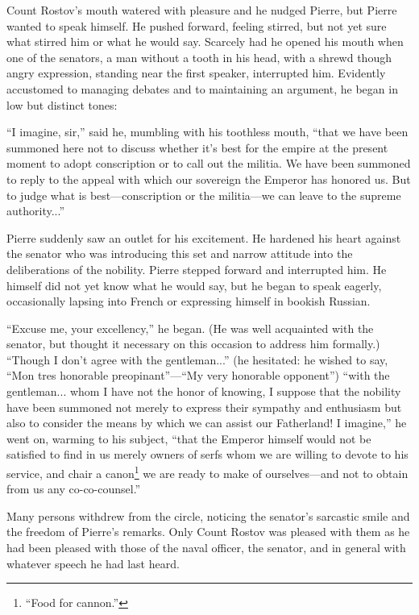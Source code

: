 Count Rostov's mouth watered with pleasure and he nudged Pierre,
but Pierre wanted to speak himself. He pushed forward, feeling
stirred, but not yet sure what stirred him or what he would
say. Scarcely had he opened his mouth when one of the senators, a
man without a tooth in his head, with a shrewd though angry
expression, standing near the first speaker, interrupted
him. Evidently accustomed to managing debates and to maintaining
an argument, he began in low but distinct tones:

``I imagine, sir,'' said he, mumbling with his toothless mouth,
``that we have been summoned here not to discuss whether it's
best for the empire at the present moment to adopt conscription
or to call out the militia.  We have been summoned to reply to
the appeal with which our sovereign the Emperor has honored
us. But to judge what is best---conscription or the militia---we
can leave to the supreme authority...''

Pierre suddenly saw an outlet for his excitement. He hardened his
heart against the senator who was introducing this set and narrow
attitude into the deliberations of the nobility. Pierre stepped
forward and interrupted him. He himself did not yet know what he
would say, but he began to speak eagerly, occasionally lapsing
into French or expressing himself in bookish Russian.

``Excuse me, your excellency,'' he began. (He was well acquainted
with the senator, but thought it necessary on this occasion to
address him formally.) ``Though I don't agree with the
gentleman...'' (he hesitated: he wished to say, ``Mon tres
honorable preopinant''---``My very honorable opponent'') ``with
the gentleman... whom I have not the honor of knowing, I suppose
that the nobility have been summoned not merely to express their
sympathy and enthusiasm but also to consider the means by which
we can assist our Fatherland! I imagine,'' he went on, warming to
his subject, ``that the Emperor himself would not be satisfied to
find in us merely owners of serfs whom we are willing to devote
to his service, and chair a canon\footnote{``Food for cannon.''}
we are ready to make of ourselves---and not to obtain from us any
co-co-counsel.''

Many persons withdrew from the circle, noticing the senator's
sarcastic smile and the freedom of Pierre's remarks. Only Count
Rostov was pleased with them as he had been pleased with those of
the naval officer, the senator, and in general with whatever
speech he had last heard.

